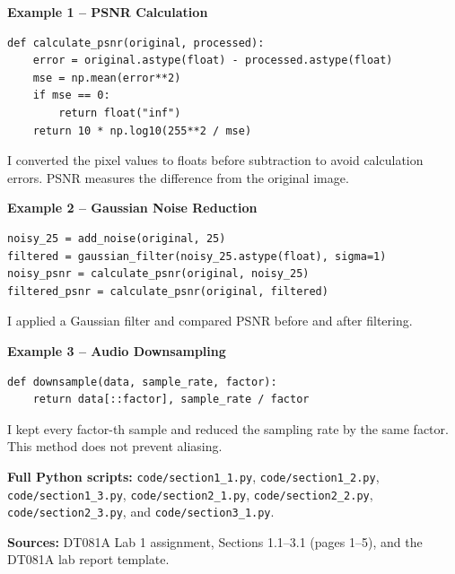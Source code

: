 \documentclass[11pt,a4paper]{article}
\begin{document}
\textbf{Example 1 -- PSNR Calculation}
\begin{verbatim}
def calculate_psnr(original, processed):
    error = original.astype(float) - processed.astype(float)
    mse = np.mean(error**2)
    if mse == 0:
        return float("inf")
    return 10 * np.log10(255**2 / mse)
\end{verbatim}
I converted the pixel values to floats before subtraction to avoid calculation errors. PSNR measures the difference from the original image.

\textbf{Example 2 -- Gaussian Noise Reduction}
\begin{verbatim}
noisy_25 = add_noise(original, 25)
filtered = gaussian_filter(noisy_25.astype(float), sigma=1)
noisy_psnr = calculate_psnr(original, noisy_25)
filtered_psnr = calculate_psnr(original, filtered)
\end{verbatim}
I applied a Gaussian filter and compared PSNR before and after filtering.

\textbf{Example 3 -- Audio Downsampling}
\begin{verbatim}
def downsample(data, sample_rate, factor):
    return data[::factor], sample_rate / factor
\end{verbatim}
I kept every factor-th sample and reduced the sampling rate by the same factor. This method does not prevent aliasing.

\noindent\textbf{Full Python scripts:}
\texttt{code/section1\_1.py},
\texttt{code/section1\_2.py},
\texttt{code/section1\_3.py},
\texttt{code/section2\_1.py},
\texttt{code/section2\_2.py},
\texttt{code/section2\_3.py},
and \texttt{code/section3\_1.py}.

\smallskip
\textbf{Sources:} DT081A Lab 1 assignment, Sections 1.1--3.1 (pages 1--5),
and the DT081A lab report template.
\end{document}
